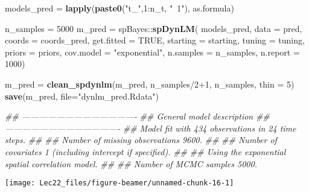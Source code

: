 \documentclass[11pt,ignorenonframetext,]{beamer}
\newenvironment{Shaded}{}{}
\newcommand{\CommentTok}[1]{\textcolor[rgb]{0.38,0.63,0.69}{\textit{#1}}}
\newcommand{\DataTypeTok}[1]{\textcolor[rgb]{0.56,0.13,0.00}{#1}}
\newcommand{\DecValTok}[1]{\textcolor[rgb]{0.25,0.63,0.44}{#1}}
\newcommand{\KeywordTok}[1]{\textcolor[rgb]{0.00,0.44,0.13}{\textbf{#1}}}
\newcommand{\NormalTok}[1]{#1}
\newcommand{\OperatorTok}[1]{\textcolor[rgb]{0.40,0.40,0.40}{#1}}
\newcommand{\OtherTok}[1]{\textcolor[rgb]{0.00,0.44,0.13}{#1}}
\newcommand{\StringTok}[1]{\textcolor[rgb]{0.25,0.44,0.63}{#1}}
\let\oldShaded\Shaded
\let\endoldShaded\endShaded
\renewenvironment{Shaded}{\footnotesize\begin{spacing}{0.9}\oldShaded}{\endoldShaded\end{spacing}}
\begin{document}
\begin{frame}[fragile]{}
\protect\hypertarget{section-2}{}

\begin{Shaded}
\begin{Highlighting}[]
\NormalTok{models_pred =}\StringTok{ }\KeywordTok{lapply}\NormalTok{(}\KeywordTok{paste0}\NormalTok{(}\StringTok{"t_"}\NormalTok{,}\DecValTok{1}\OperatorTok{:}\NormalTok{n_t, }\StringTok{"~1"}\NormalTok{), as.formula)}

\NormalTok{n_samples =}\StringTok{ }\DecValTok{5000}
\NormalTok{m_pred =}\StringTok{ }\NormalTok{spBayes}\OperatorTok{::}\KeywordTok{spDynLM}\NormalTok{(}
\NormalTok{  models_pred, }\DataTypeTok{data =}\NormalTok{ pred, }\DataTypeTok{coords =}\NormalTok{ coords_pred, }\DataTypeTok{get.fitted =} \OtherTok{TRUE}\NormalTok{,}
  \DataTypeTok{starting =}\NormalTok{ starting, }\DataTypeTok{tuning =}\NormalTok{ tuning, }\DataTypeTok{priors =}\NormalTok{ priors,}
  \DataTypeTok{cov.model =} \StringTok{"exponential"}\NormalTok{, }\DataTypeTok{n.samples =}\NormalTok{ n_samples, }\DataTypeTok{n.report =} \DecValTok{1000}\NormalTok{)}

\NormalTok{m_pred =}\StringTok{ }\KeywordTok{clean_spdynlm}\NormalTok{(m_pred, n_samples}\OperatorTok{/}\DecValTok{2}\OperatorTok{+}\DecValTok{1}\NormalTok{, n_samples, }\DataTypeTok{thin =} \DecValTok{5}\NormalTok{)}
\KeywordTok{save}\NormalTok{(m_pred, }\DataTypeTok{file=}\StringTok{"dynlm_pred.Rdata"}\NormalTok{)}

\CommentTok{## ----------------------------------------}
\CommentTok{##  General model description}
\CommentTok{## ----------------------------------------}
\CommentTok{## Model fit with 434 observations in 24 time steps.}
\CommentTok{## }
\CommentTok{## Number of missing observations 9600.}
\CommentTok{## }
\CommentTok{## Number of covariates 1 (including intercept if specified).}
\CommentTok{## }
\CommentTok{## Using the exponential spatial correlation model.}
\CommentTok{## }
\CommentTok{## Number of MCMC samples 5000.}
\end{Highlighting}
\end{Shaded}

\end{frame}

\begin{frame}{}
\protect\hypertarget{section-3}{}

\begin{center}\texttt{[image: Lec22\_files/figure-beamer/unnamed-chunk-16-1]} \end{center}

\end{frame}
\end{document}
